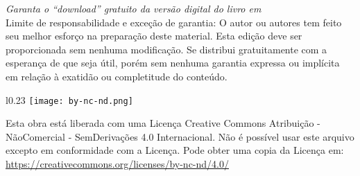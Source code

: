 \noindent \textit{Garanta o ``download'' gratuito da versão digital do livro em \ImprimirLinkHomePageLivro}\\


\noindent Limite de responsabilidade e exceção de garantia: O autor ou autores tem feito
seu melhor esforço na preparação deste material.
Esta edição deve ser proporcionada sem nenhuma modificação. 
Se distribui gratuitamente com a esperança de que seja útil, 
porém sem nenhuma garantia expressa ou implícita em relação à exatidão ou completitude do conteúdo.


\vfill
\begin{wrapfigure}{l}{0.23\textwidth}
\texttt{[image: by-nc-nd.png]}
\end{wrapfigure}
\noindent Esta obra está liberada com uma Licença 
Creative Commons Atribuição - NãoComercial - SemDerivações 4.0 Internacional.
Não é possível usar este arquivo excepto em conformidade com a Licença. 
Pode obter uma copia da Licença em:
\url{https://creativecommons.org/licenses/by-nc-nd/4.0/}\\ %
